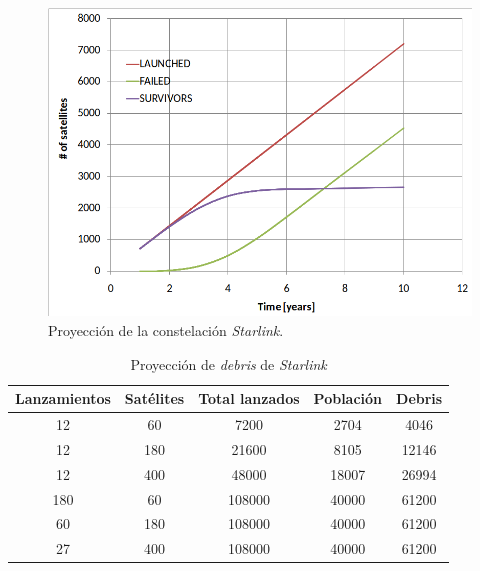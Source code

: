\begin{figure}[htbp]
	\centering
	\includegraphics[width=.8\textwidth]{./Figures/starlinkpopulation.png}
    \caption{Proyección de la constelación \emph{Starlink}\citep{ARTICLE:cibils}.}
	\label{fig:starlinkdeath}
\end{figure}

\begin{table}[h]
	\centering
    \caption[Proyección de \emph{debris}]{Proyección de \emph{debris} de \emph{Starlink}\citep{ARTICLE:cibils}}
	\begin{tabular}{c c c c c}    
		\toprule
        \textbf{Lanzamientos} & \textbf{Satélites} & \textbf{Total lanzados} & \textbf{Población} & \textbf{Debris}\\
		\midrule
        12                    & 60                 & 7200                    & 2704               & 4046\\		
        12                    & 180                & 21600                   & 8105               & 12146\\		
        12                    & 400                & 48000                   & 18007              & 26994\\		
        180                   & 60                 & 108000                  & 40000              & 61200\\		
        60                    & 180                & 108000                  & 40000              & 61200\\		
        27                    & 400                & 108000                  & 40000              & 61200\\		
		\bottomrule
		\hline
	\end{tabular}
	\label{tab:starlinkdebris}
\end{table}

